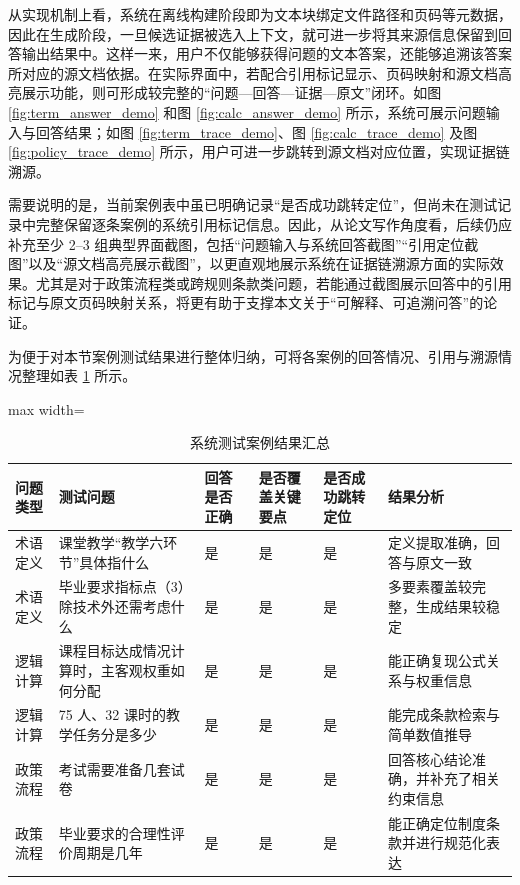 \documentclass[UTF8,a4paper,zihao=-4]{ctexart}
\begin{document}
从实现机制上看，系统在离线构建阶段即为文本块绑定文件路径和页码等元数据，因此在生成阶段，一旦候选证据被选入上下文，就可进一步将其来源信息保留到回答输出结果中。这样一来，用户不仅能够获得问题的文本答案，还能够追溯该答案所对应的源文档依据。在实际界面中，若配合引用标记显示、页码映射和源文档高亮展示功能，则可形成较完整的“问题—回答—证据—原文”闭环。如图 \ref{fig:term_answer_demo} 和图 \ref{fig:calc_answer_demo} 所示，系统可展示问题输入与回答结果；如图 \ref{fig:term_trace_demo}、图 \ref{fig:calc_trace_demo} 及图 \ref{fig:policy_trace_demo} 所示，用户可进一步跳转到源文档对应位置，实现证据链溯源。


需要说明的是，当前案例表中虽已明确记录“是否成功跳转定位”，但尚未在测试记录中完整保留逐条案例的系统引用标记信息。因此，从论文写作角度看，后续仍应补充至少 2--3 组典型界面截图，包括“问题输入与系统回答截图”“引用定位截图”以及“源文档高亮展示截图”，以更直观地展示系统在证据链溯源方面的实际效果。尤其是对于政策流程类或跨规则条款类问题，若能通过截图展示回答中的引用标记与原文页码映射关系，将更有助于支撑本文关于“可解释、可追溯问答”的论证。

为便于对本节案例测试结果进行整体归纳，可将各案例的回答情况、引用与溯源情况整理如表 \ref{tab:case_test_summary} 所示。

\begin{table}[H]
\centering
\caption{系统测试案例结果汇总}
\label{tab:case_test_summary}
{\small
\renewcommand{\arraystretch}{1.2}
\begin{adjustbox}{max width=\textwidth}
\begin{tabular}{llllll}
\toprule
问题类型 & 测试问题 & 回答是否正确 & 是否覆盖关键要点 & 是否成功跳转定位 & 结果分析 \\
\midrule
术语定义 & 课堂教学“教学六环节”具体指什么 & 是 & 是 & 是 & 定义提取准确，回答与原文一致 \\
术语定义 & 毕业要求指标点（3）除技术外还需考虑什么 & 是 & 是 & 是 & 多要素覆盖较完整，生成结果较稳定 \\
逻辑计算 & 课程目标达成情况计算时，主客观权重如何分配 & 是 & 是 & 是 & 能正确复现公式关系与权重信息 \\
逻辑计算 & 75 人、32 课时的教学任务分是多少 & 是 & 是 & 是 & 能完成条款检索与简单数值推导 \\
政策流程 & 考试需要准备几套试卷 & 是 & 是 & 是 & 回答核心结论准确，并补充了相关约束信息 \\
政策流程 & 毕业要求的合理性评价周期是几年 & 是 & 是 & 是 & 能正确定位制度条款并进行规范化表达 \\
\bottomrule
\end{tabular}
\end{adjustbox}
}
\end{table}
\end{document}
